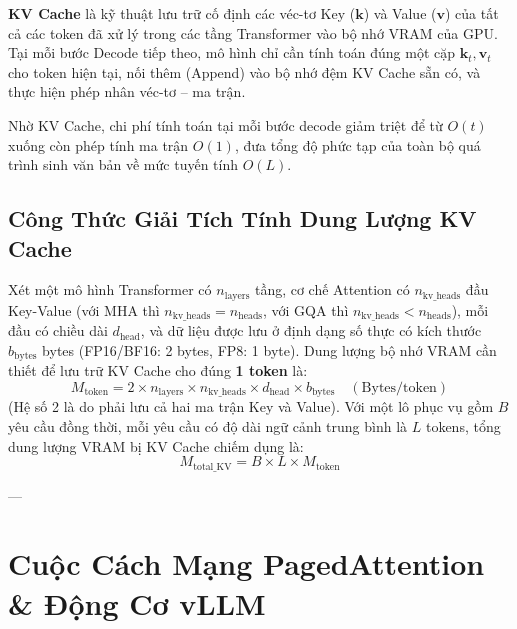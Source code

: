 \begin{definition}[KV Cache]
\textbf{KV Cache} là kỹ thuật lưu trữ cố định các véc-tơ Key ($\mathbf{k}$) và Value ($\mathbf{v}$) của tất cả các token đã xử lý trong các tầng Transformer vào bộ nhớ VRAM của GPU. Tại mỗi bước Decode tiếp theo, mô hình chỉ cần tính toán đúng một cặp $\mathbf{k}_t, \mathbf{v}_t$ cho token hiện tại, nối thêm (Append) vào bộ nhớ đệm KV Cache sẵn có, và thực hiện phép nhân véc-tơ -- ma trận.
\end{definition}

Nhờ KV Cache, chi phí tính toán tại mỗi bước decode giảm triệt để từ $O(t)$ xuống còn phép tính ma trận $O(1)$, đưa tổng độ phức tạp của toàn bộ quá trình sinh văn bản về mức tuyến tính $O(L)$.

\subsection{Công Thức Giải Tích Tính Dung Lượng KV Cache}
\begin{theorem}
Xét một mô hình Transformer có $n_{\text{layers}}$ tầng, cơ chế Attention có $n_{\text{kv\_heads}}$ đầu Key-Value (với MHA thì $n_{\text{kv\_heads}} = n_{\text{heads}}$, với GQA thì $n_{\text{kv\_heads}} < n_{\text{heads}}$), mỗi đầu có chiều dài $d_{\text{head}}$, và dữ liệu được lưu ở định dạng số thực có kích thước $b_{\text{bytes}}$ bytes (FP16/BF16: 2 bytes, FP8: 1 byte).
Dung lượng bộ nhớ VRAM cần thiết để lưu trữ KV Cache cho đúng \textbf{1 token} là:
\begin{equation}
M_{\text{token}} = 2 \times n_{\text{layers}} \times n_{\text{kv\_heads}} \times d_{\text{head}} \times b_{\text{bytes}} \quad (\text{Bytes/token})
\label{eq:kv-cache-per-token}
\end{equation}
(Hệ số 2 là do phải lưu cả hai ma trận Key và Value).
Với một lô phục vụ gồm $B$ yêu cầu đồng thời, mỗi yêu cầu có độ dài ngữ cảnh trung bình là $L$ tokens, tổng dung lượng VRAM bị KV Cache chiếm dụng là:
\begin{equation}
M_{\text{total\_KV}} = B \times L \times M_{\text{token}}
\label{eq:kv-cache-total}
\end{equation}
\end{theorem}

---

\section{Cuộc Cách Mạng PagedAttention \& Động Cơ vLLM}
\label{sec:pagedattention-vllm}

